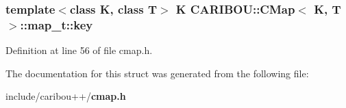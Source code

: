 \subsubsection[{key}]{\setlength{\rightskip}{0pt plus 5cm}template$<$class K, class T$>$ K {\bf C\-A\-R\-I\-B\-O\-U\-::\-C\-Map}$<$ K, T $>$\-::map\-\_\-t\-::key}\label{struct_c_a_r_i_b_o_u_1_1_c_map_1_1map__t_a2ec161b705da8b38bfcd59469250668d}


Definition at line 56 of file cmap.\-h.



The documentation for this struct was generated from the following file\-:\begin{DoxyCompactItemize}
\item 
include/caribou++/{\bf cmap.\-h}\end{DoxyCompactItemize}
